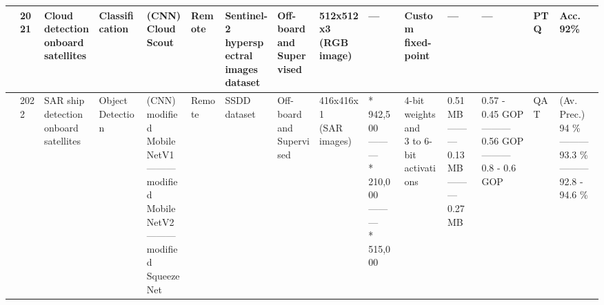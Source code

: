 \begin{center}
{\begin{tabular}{lllllllllllllll}
\cite{paciniMultiCacheSystemOnChip2021} & 2021 & \makecell[tl]{Cloud detection\\ onboard\\ satellites} & Classification & \makecell[tl]{(CNN)\\ CloudScout} & Remote & \makecell[tl]{Sentinel-2\\ hyperspectral\\ images dataset} & \makecell[tl]{Off-board\\ and\\ Supervised} & \makecell[tl]{512x512x3\\ (RGB image)} & --- & \makecell[tl]{Custom\\ fixed-point} & --- & --- & PTQ & Acc. 92\% \\ \hline
\cite{yangAlgorithmHardwareCodesign2022} & 2022 & \makecell[tl]{SAR ship\\ detection\\ onboard\\ satellites} & \makecell[tl]{Object\\ Detection} & \makecell[tl]{(CNN)\\ modified\\ MobileNetV1\\ ---------\\ modified\\ MobileNetV2\\ ---------\\ modified\\ SqueezeNet} & Remote & SSDD dataset & \makecell[tl]{Off-board\\ and\\ Supervised} & \makecell[tl]{416x416x1\\ (SAR images)} & \makecell[tl]{* 942,500\\ ---------\\ * 210,000\\ ---------\\ * 515,000} & \makecell[tl]{4-bit weights\\ and\\ 3 to 6-bit\\ activations} & \makecell[tl]{0.51 MB\\ ---------\\ 0.13 MB\\ ---------\\ 0.27 MB} & \makecell[tl]{0.57 - 0.45 GOP\\ ---------\\ 0.56 GOP\\ ---------\\ 0.8 - 0.6 GOP} & QAT & \makecell[tl]{(Av. Prec.)\\ 94 \%\\ ---------\\ 93.3 \%\\ ---------\\ 92.8 - 94.6 \%}  \\ 

\end{tabular}}
\end{center}
